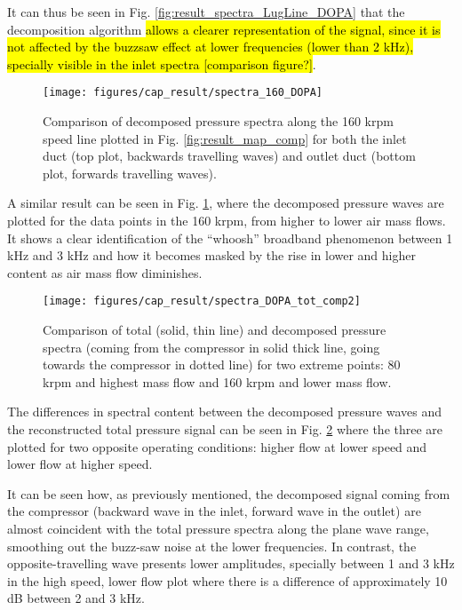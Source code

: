 It can thus be seen in Fig. \ref{fig:result_spectra_LugLine_DOPA} that the decomposition algorithm \hl{allows a clearer representation of the signal, since it is not affected by the buzzsaw effect at lower frequencies (lower than 2 kHz), specially visible in the inlet spectra [comparison figure?]}.

\begin{figure}[tbh!]
\centering
\texttt{[image: figures/cap\_result/spectra\_160\_DOPA]}
\caption{Comparison of decomposed pressure spectra along the 160 krpm speed line plotted in Fig. \ref{fig:result_map_comp} for both the inlet duct (top plot, backwards travelling waves) and outlet duct (bottom plot, forwards travelling waves).}
\label{fig:result_spectra_160_DOPA}
\end{figure}

A similar result can be seen in Fig. \ref{fig:result_spectra_160_DOPA}, where the decomposed pressure waves are plotted for the data points in the 160 krpm, from higher to lower air mass flows. It shows a clear identification of the ``whoosh'' broadband phenomenon between 1 kHz and 3 kHz and how it becomes masked by the rise in lower and higher content as air mass flow diminishes.

\begin{figure}[tbh!]
\centering
\texttt{[image: figures/cap\_result/spectra\_DOPA\_tot\_comp2]}
\caption{Comparison of total (solid, thin line) and decomposed pressure spectra (coming from the compressor in solid thick line, going towards the compressor in dotted line) for two extreme points: 80 krpm and highest mass flow and 160 krpm and lower mass flow.}
\label{fig:result_spectra_DOPA_tot_comp}
\end{figure}

The differences in spectral content between the decomposed pressure waves and the reconstructed total pressure signal can be seen in Fig. \ref{fig:result_spectra_DOPA_tot_comp} where the three are plotted for two opposite operating conditions: higher flow at lower speed and lower flow at higher speed.

It can be seen how, as previously mentioned, the decomposed signal coming from the compressor (backward wave in the inlet, forward wave in the outlet) are almost coincident with the total pressure spectra along the plane wave range, smoothing out the buzz-saw noise at the lower frequencies. In contrast, the opposite-travelling wave presents lower amplitudes, specially between 1 and 3 kHz in the high speed, lower flow plot where there is a difference of approximately 10 dB between 2 and 3 kHz.

